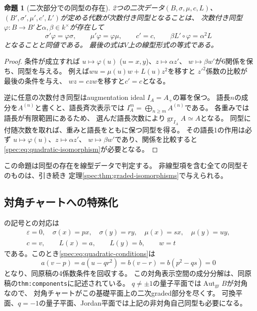 \documentclass[11pt,a4paper]{ltjsarticle}
\newtheorem{proposition}[theorem]{命題}
\theoremstyle{definition}
\newcommand{\Aut}{\operatorname{Aut}}
\newcommand{\gr}{\operatorname{gr}}
\begin{document}
\begin{proposition}[二次部分での同型の存在]\label{spec:prop:quadratic-isomorphisms}
2つの二次データ$(B,\sigma,\mu,c,L)$、
$(B',\sigma',\mu',c',L')$が定める代数が次数付き同型となることは、
次数付き同型$\varphi:B\to B'$と$\alpha,\beta\in k^\times$が存在して
\begin{equation}\label{spec:eq:quadratic-isomorphism}
\sigma'\varphi=\varphi\sigma,\qquad
\mu'\varphi=\varphi\mu,\qquad
c'=c,\qquad
\beta L'\circ\varphi=\alpha^2L
\end{equation}
となることと同値である。
最後の式は$V$上の線型形式の等式である。
\end{proposition}
\begin{proof}
条件が成立すれば
$u\mapsto\varphi(u)$ ($u=x,y$)、$z\mapsto\alpha z'$、
$w\mapsto\beta w'$が6関係を保ち、同型を与える。
例えば$wu=\mu(u)w+L(u)z^2$を移すと
$z'^2$係数の比較が最後の条件を与え、
$wz=czw$を移すと$c'=c$となる。

逆に任意の次数付き同型はaugmentation ideal $I_A=A_+$の冪を保つ。
語長$n$の成分を$A^{(n)}$と書くと、語長斉次表示では
$I_A^m=\bigoplus_{n\geq m}A^{(n)}$である。
各重みでは語長が有限範囲にあるため、
選んだ語長次数により$\gr_{I_A}A\simeq A$となる。
同型に付随次数を取れば、重みと語長をともに保つ同型を得る。
その語長1の作用は必ず
$u\mapsto\varphi(u)$、$z\mapsto\alpha z'$、
$w\mapsto\beta w'$であり、関係を比較すると
\eqref{spec:eq:quadratic-isomorphism}が必要となる。
\end{proof}

この命題は同型の存在を線型データで判定する。
非線型項を含む全ての同型そのものは、引き続き
定理\ref{spec:thm:graded-isomorphisms}で与えられる。

\subsection{対角チャートへの特殊化}
の記号との対応は
\[
\begin{gathered}
\varepsilon=0,\quad \sigma(x)=px,\quad \sigma(y)=ry,\quad
\mu(x)=sx,\quad \mu(y)=uy,\\
c=v,\qquad L(x)=a,\qquad L(y)=b,\qquad w=t
\end{gathered}
\]
である。このとき\eqref{spec:eq:quadratic-conditions}は
\[
a(v-p)=a(u-qr^2)=b(v-r)=b(p^2-qs)=0
\]
となり、同原稿の4係数条件を回収する。
この対角表示空間の成分分解は、同原稿の\texttt{thm:components}に記述されている。
$q\ne\pm1$の量子平面では$\Aut_{\mathrm{gr}}B$が対角なので、
対角チャートがこの基礎平面上の二次graded部分を尽くす。
可換平面、$q=-1$の量子平面、Jordan平面では上記の非対角自己同型も必要になる。
\end{document}
